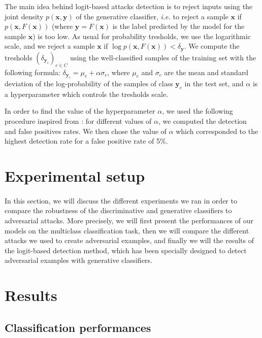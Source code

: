 \documentclass[10pt,twocolumn,letterpaper]{article}
\begin{document}
The main idea behind logit-based attacks detection is to reject inputs using the joint density $p(\bm{x}, \bm{y})$ of the generative classifier, \textit{i.e.} to reject a sample $\bm{x}$ if $p(\bm{x}, F(\bm{x}))$ (where $\bm{y} = F(\bm{x})$ is the label predicted by the model for the sample $\bm{x}$) is too low. As usual for probability tresholds, we use the logarithmic scale, and we reject a sample $\bm{x}$ if $\log{p(\bm{x}, F(\bm{x}))} < \delta_{\bm{y}}$. We compute the tresholds $(\delta_{\bm{y}_c})_{c \in C}$ using the well-classified samples of the training set with the following formula: $\delta_{\bm{y}_c} = \mu_c + \alpha \sigma_c$, where $\mu_c$ and $\sigma_c$ are the mean and standard deviation of the log-probability of the samples of class $\bm{y}_c$ in the test set, and $\alpha$ is a hyperparameter which controls the tresholds scale.

In order to find the value of the hyperparameter $\alpha$, we used the following procedure inspired from \cite{main_paper}: for different values of $\alpha$, we computed the detection and false positives rates. We then chose the value of $\alpha$ which corresponded to the highest detection rate for a false positive rate of 5\%.

\section{Experimental setup}
\label{sec:setup}

\paragraph{} In this section, we will discuss the different experiments we ran in order to compare the robustness of the discriminative and generative classifiers to adversarial attacks. More precisely, we will first present the performances of our models on the multiclass classification task, then we will compare the different attacks we used to create adversarial examples, and finally we will the results of the logit-based detection method, which has been specially designed to detect adversarial examples with generative classifiers. 

\section{Results}
\label{sec:results}

\subsection{Classification performances}
\end{document}
